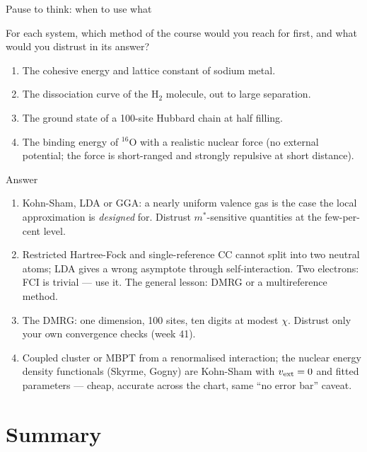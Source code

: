 \documentclass[aspectratio=169,10pt]{beamer}
\newcounter{thinkctr}
\newcommand{\thinkq}[2]{%
  \stepcounter{thinkctr}%
  \vfill
  \begin{tcolorbox}[enhanced,colback=palewarm,colframe=warm,boxrule=1.2pt,arc=4pt,
    grow to left by=6mm,grow to right by=6mm,
    left=16pt,right=16pt,top=16pt,bottom=18pt,
    fonttitle=\bfseries\Large,fontupper=\Large,
    title={Pause to think \#\thethinkctr\hfill\mdseries\normalsize(about #1 min -- discuss with your neighbour)}]
  #2
  \end{tcolorbox}
  \vfill}
\newcommand{\thinka}[1]{%
  \vfill
  \begin{tcolorbox}[enhanced,colback=paleteal,colframe=teal,boxrule=1.2pt,arc=4pt,
    grow to left by=6mm,grow to right by=6mm,
    left=16pt,right=16pt,top=16pt,bottom=18pt,
    fonttitle=\bfseries\Large,fontupper=\large,
    title={Answer to pause \#\thethinkctr}]
  #1
  \end{tcolorbox}
  \vfill}
\begin{document}
\begin{frame}{Pause to think: when to use what}
  \thinkq{4}{
  For each system, which method of the course would you reach for first, and what would you distrust in its answer?
  \begin{enumerate}
    \item The cohesive energy and lattice constant of sodium metal.
    \item The dissociation curve of the H$_2$ molecule, out to large separation.
    \item The ground state of a 100-site Hubbard chain at half filling.
    \item The binding energy of $^{16}$O with a realistic nuclear force (no external potential; the force is short-ranged and strongly repulsive at short distance).
  \end{enumerate}}
\end{frame}

\begin{frame}[shrink=2]{Answer}
  \thinka{
  \begin{enumerate}
    \item Kohn-Sham, LDA or GGA: a nearly uniform valence gas is the case the local approximation is \emph{designed} for. Distrust $m^{*}$-sensitive quantities at the few-per-cent level.
    \item Restricted Hartree-Fock and single-reference CC cannot split into two neutral atoms; LDA gives a wrong asymptote through self-interaction. Two electrons: FCI is trivial --- use it. The general lesson: DMRG or a multireference method.
    \item The DMRG: one dimension, 100 sites, ten digits at modest $\chi$. Distrust only your own convergence checks (week 41).
    \item Coupled cluster or MBPT from a renormalised interaction; the nuclear energy density functionals (Skyrme, Gogny) are Kohn-Sham with $v_{\rm ext}=0$ and fitted parameters --- cheap, accurate across the chart, same ``no error bar'' caveat.
  \end{enumerate}}
\end{frame}

\section{Summary}
\end{document}
